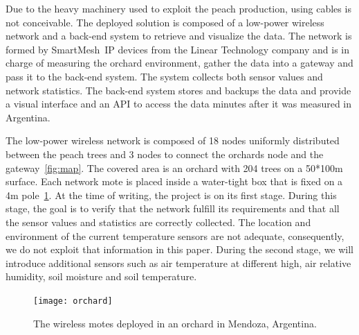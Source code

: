 \documentclass{sig-alternate}
\newcommand{\smip}           {SmartMesh~IP\xspace}
\begin{document}

Due to the heavy machinery used to exploit the peach production, using cables is not conceivable.
The deployed solution is composed of a low-power wireless network and a back-end system to retrieve and visualize the data.
The network is formed by \smip devices from the Linear Technology company and is in charge of measuring the orchard environment, gather the data into a gateway and pass it to the back-end system.
The system collects both sensor values and network statistics.
The back-end system stores and backups the data and provide a visual interface and an API to access the data minutes after it was measured in Argentina.


The low-power wireless network is composed of 18 nodes uniformly distributed between the peach trees and 3 nodes to connect the orchards node and the gateway~\ref{fig:map}.
The covered area is an orchard with 204 trees on a 50*100m surface.
Each network mote is placed inside a water-tight box that is fixed on a 4m pole~\ref{fig:orchard}.
At the time of writing, the project is on its first stage.
During this stage, the goal is to verify that the network fulfill its requirements and that all the sensor values and statistics are correctly collected.
The location and environment of the current temperature sensors are not adequate, consequently, we do not exploit that information in this paper.
During the second stage, we will introduce additional sensors such as air temperature at different high, air relative humidity, soil moisture and soil temperature.

\begin{figure}
    \centering
    \texttt{[image: orchard]}
    \caption{The wireless motes deployed in an orchard in Mendoza, Argentina.}
    \label{fig:orchard}
\end{figure}
\end{document}
